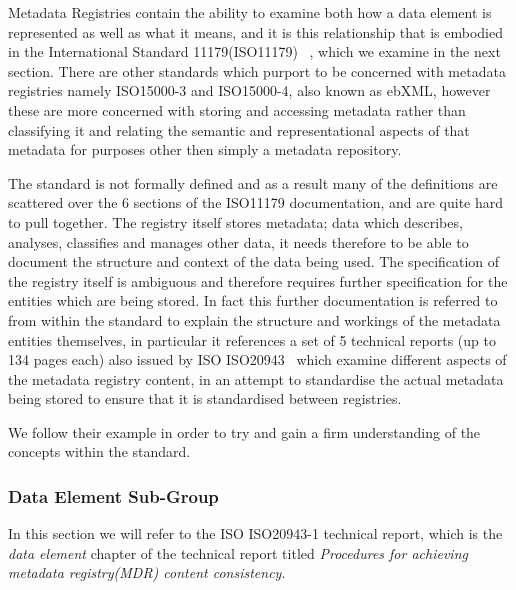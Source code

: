 \documentclass{article}
\begin{document}
Metadata Registries contain the ability to examine both how a data element is represented as well as what it means, and it is this relationship that is embodied in the International Standard 11179(ISO11179) ~\cite{ISO11179}, which we examine in the next section. There are other standards which purport to be concerned with metadata registries namely ISO15000-3 and ISO15000-4, also known as ebXML, however these are more concerned with storing and accessing metadata rather than classifying it and relating the semantic and representational aspects of that metadata for purposes other then simply a metadata repository.

The standard is not formally defined and as a result many of the definitions are scattered over the 6 sections of the ISO11179 documentation, and are quite hard to pull together. The registry itself stores metadata; data which describes, analyses, classifies and manages other data, it needs therefore to be able to document the structure and context of the data being used. The specification of the registry itself is ambiguous and therefore requires further specification for the entities which are being stored. In fact this further documentation is referred to from within the standard to explain the structure and workings of the metadata entities themselves, in particular it references a set of 5 technical reports (up to 134 pages each) also issued by ISO ISO20943~\cite{ISO20943} which examine different aspects of the metadata registry content, in an attempt to standardise the actual metadata being stored to ensure that it is standardised between registries.  


We follow their example in order to try and gain a firm understanding of the concepts within the standard. 

\subsubsection{Data Element Sub-Group}
In this section we will refer to the ISO ISO20943-1 technical report, which is the \emph{data element} chapter of the technical report titled \emph{Procedures for achieving metadata registry(MDR) content consistency}.
\end{document}
